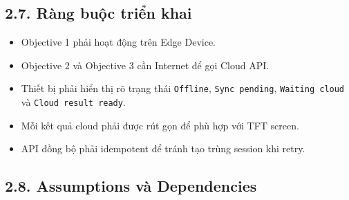 \documentclass[12pt,a4paper]{article}
\begin{document}
\subsection*{2.7. Ràng buộc triển khai}

\begin{itemize}
\item Objective 1 phải hoạt động trên Edge Device.
\item Objective 2 và Objective 3 cần Internet để gọi Cloud API.
\item Thiết bị phải hiển thị rõ trạng thái \texttt{Offline}, \texttt{Sync pending}, \texttt{Waiting cloud} và \texttt{Cloud result ready}.
\item Mỗi kết quả cloud phải được rút gọn để phù hợp với TFT screen.
\item API đồng bộ phải idempotent để tránh tạo trùng session khi retry.
\end{itemize}

\subsection*{2.8. Assumptions và Dependencies}
\end{document}
